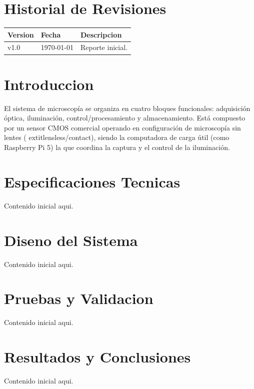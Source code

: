 \documentclass[a4paper, twoside, 12pt]{report}
\begin{document}

\begin{abstract}
    Escribe aqui el resumen ejecutivo del reporte.
\end{abstract}

\chapter*{Historial de Revisiones}
\begin{center}
\begin{tabular}{p{2cm} p{3cm} p{9cm}}
\toprule
\textbf{Version} & \textbf{Fecha} & \textbf{Descripcion} \\
\midrule
v1.0 & \today & Reporte inicial. \\
\bottomrule
\end{tabular}
\end{center}

\clearpage
\tableofcontents
\listoffigures
\listoftables
\clearpage


\chapter{Introduccion}
El sistema de microscopía se organiza en cuatro bloques funcionales: adquisición óptica, iluminación, control/procesamiento y almacenamiento. Está compuesto por un sensor CMOS comercial operando en configuración de microscopía sin lentes (	extit{lensless/contact}), siendo la computadora de carga útil (como Raspberry Pi 5) la que coordina la captura y el control de la iluminación.

\chapter{Especificaciones Tecnicas}
Contenido inicial aqui.

\chapter{Diseno del Sistema}
Contenido inicial aqui.

\chapter{Pruebas y Validacion}
Contenido inicial aqui.

\chapter{Resultados y Conclusiones}
Contenido inicial aqui.

% 
% 
\end{document}
